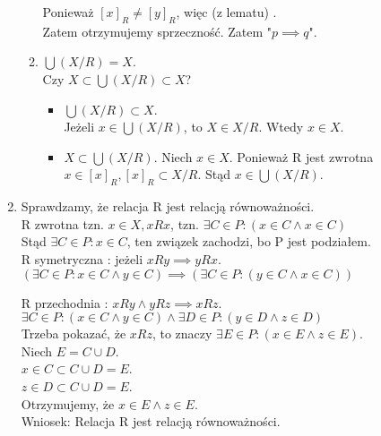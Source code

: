 \documentclass[a5paper,8pt]{article}
\theoremstyle{mythmstyle}
\begin{document}
\begin{enumerate}
\begin{enumerate}
                        Ponieważ $ [x]_R \neq [y]_R $, więc (z lematu) .\\
                        Zatem otrzymujemy sprzeczność. Zatem "$p \implies q$".

                        \item $ \bigcup (X / R) = X $. \\

                        Czy $X \subset \bigcup (X / R) \subset X$?
                        \begin{itemize}
                            \item $\bigcup (X / R) \subset X$. \\
                            Jeżeli $x \in \bigcup (X / R)$, to $X \in X/R$. Wtedy $x \in X$.

                            \item $X \subset \bigcup (X/R)$. Niech $x \in X$. Ponieważ R jest
                            zwrotna $x \in [x]_R, [x]_R \subset X/R $. Stąd $ x \in \bigcup(X/ R) $.
                        \end{itemize}
                    \end{enumerate}

                    \item Sprawdzamy, że relacja R jest relacją równoważności.\\

                    R zwrotna tzn. $x \in X, x R x$, tzn. $ \exists C \in P : (x \in C \wedge x \in C) $\\
                    Stąd $ \exists C \in P : x \in C $, ten związek zachodzi, bo P jest podziałem.\\

                    R symetryczna : jeżeli $x R y \implies y R x$.\\
                    $ (\exists C \in P : x \in C \wedge y \in C) \implies (\exists C \in P : (y \in C \wedge x \in C)) $

                    R przechodnia : $x R y \wedge y R z \implies x R z$.\\
                    $ \exists C \in P : (x \in C \wedge y \in C) \wedge \exists D \in P : (y \in D \wedge z \in D) $\\

                    Trzeba pokazać, że $ x R z $, to znaczy $ \exists E \in P : (x \in E \wedge z \in E ) $.\\
                    Niech $ E = C \cup D $.\\
                    $ x \in C \subset C \cup D = E $.\\
                    $ z \in D \subset C \cup D = E $.\\
                    Otrzymujemy, że $ x \in E \wedge z \in E$.\\
                    Wniosek: Relacja R jest relacją równoważności.

            \end{enumerate}
\end{document}
